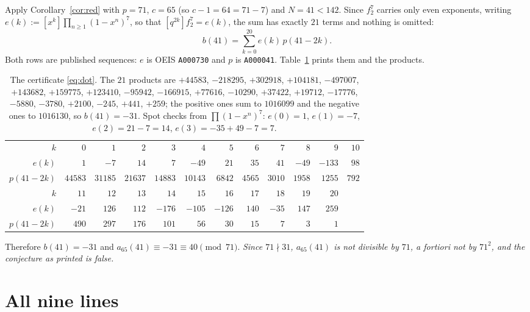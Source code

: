 \documentclass[11pt]{amsart}
\theoremstyle{definition}
\theoremstyle{remark}
\begin{document}
Apply Corollary~\ref{cor:red} with $p=71$, $c=65$ (so $c-1=64=71-7$) and $N=41<142$.
Since $f_2^{7}$ carries only even exponents, writing
$e(k):=[x^k]\prod_{n\ge1}(1-x^n)^7$, so that $[q^{2k}]f_2^{7}=e(k)$, the sum has exactly
$21$ terms and nothing is omitted:
\begin{equation}\label{eq:dot}
 b(41)=\sum_{k=0}^{20}e(k)\,p(41-2k).
\end{equation}
Both rows are published sequences: $e$ is OEIS \texttt{A000730} \cite{A000730} and $p$ is
\texttt{A000041}. Table~\ref{tab:dot} prints them and the products.

\begin{table}[ht]
\scriptsize
\begin{tabular}{r|rrrrrrrrrrr}
$k$ & $0$ & $1$ & $2$ & $3$ & $4$ & $5$ & $6$ & $7$ & $8$ & $9$ & $10$\\
$e(k)$ & $1$ & $-7$ & $14$ & $7$ & $-49$ & $21$ & $35$ & $41$ & $-49$ & $-133$ & $98$\\
$p(41-2k)$ & $44583$ & $31185$ & $21637$ & $14883$ & $10143$ & $6842$ & $4565$ & $3010$
 & $1958$ & $1255$ & $792$\\
\hline
$k$ & $11$ & $12$ & $13$ & $14$ & $15$ & $16$ & $17$ & $18$ & $19$ & $20$ &\\
$e(k)$ & $-21$ & $126$ & $112$ & $-176$ & $-105$ & $-126$ & $140$ & $-35$ & $147$
 & $259$ &\\
$p(41-2k)$ & $490$ & $297$ & $176$ & $101$ & $56$ & $30$ & $15$ & $7$ & $3$ & $1$ &
\end{tabular}
\medskip
\caption{The certificate \eqref{eq:dot}. The $21$ products are
$+44583$, $-218295$, $+302918$, $+104181$, $-497007$, $+143682$, $+159775$, $+123410$,
$-95942$, $-166915$, $+77616$, $-10290$, $+37422$, $+19712$, $-17776$, $-5880$, $-3780$,
$+2100$, $-245$, $+441$, $+259$; the positive ones sum to $1016099$ and the negative ones
to $1016130$, so $b(41)=-31$. Spot checks from $\prod(1-x^n)^7$: $e(0)=1$, $e(1)=-7$,
$e(2)=21-7=14$, $e(3)=-35+49-7=7$.}
\label{tab:dot}
\end{table}

Therefore $b(41)=-31$ and $a_{65}(41)\equiv-31\equiv40\pmod{71}$. \emph{Since $71\nmid31$,
$a_{65}(41)$ is not divisible by $71$, a fortiori not by $71^2$, and the conjecture as
printed is false.}

\section{All nine lines}\label{sec:census}
\end{document}
